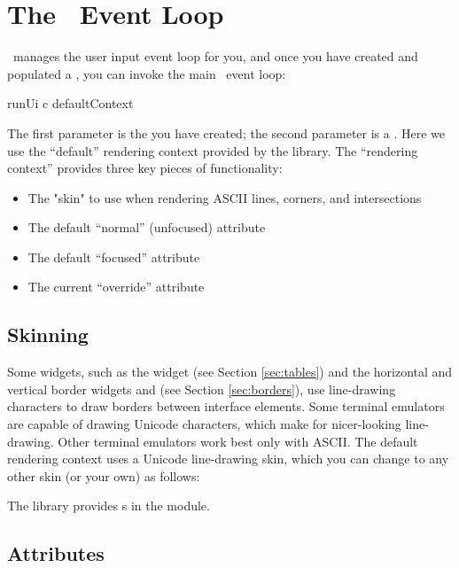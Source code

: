 \section{The \vtyui\ Event Loop}
\label{sec:event_loop}

\vtyui\ manages the user input event loop for you, and once you have
created and populated a , you can invoke the main
\vtyui\ event loop:

\begin{haskellcode}
 runUi c defaultContext
\end{haskellcode}

The first parameter is the  you have created; the
second parameter is a .  Here we use the ``default''
rendering context provided by the library.  The ``rendering context''
provides three key pieces of functionality:

\begin{itemize}
\item The "skin" to use when rendering ASCII lines, corners, and
      intersections
\item The default ``normal'' (unfocused) attribute
\item The default ``focused'' attribute
\item The current ``override'' attribute
\end{itemize}

\subsection{Skinning}
\label{sec:skinning}

Some widgets, such as the  widget (see Section
\ref{sec:tables}) and the horizontal and vertical border widgets
 and  (see Section \ref{sec:borders}), use
line-drawing characters to draw borders between interface elements.
Some terminal emulators are capable of drawing Unicode characters,
which make for nicer-looking line-drawing.  Other terminal emulators
work best only with ASCII.  The default rendering context uses a
Unicode line-drawing skin, which you can change to any other skin (or
your own) as follows:


The library provides s in the  module.

\subsection{Attributes}
\label{sec:attributes}

